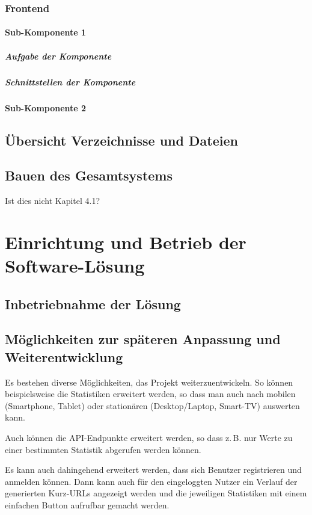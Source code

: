 \documentclass[a4paper,11pt,DIV=12,overfullrule=on]{scrreprt}%
\begin{document}
\subsection{Frontend}
\subsubsection{Sub-Komponente 1}
\paragraph{Aufgabe der Komponente}
\paragraph{Schnittstellen der Komponente}
\subsubsection{Sub-Komponente 2}
\section{Übersicht Verzeichnisse und Dateien}
\section{Bauen des Gesamtsystems}
Ist dies nicht Kapitel 4.1?


\chapter{Einrichtung und Betrieb der Software-Lösung}
\section{Inbetriebnahme der Lösung}
\section{Möglichkeiten zur späteren Anpassung und Weiterentwicklung}
Es bestehen diverse Möglichkeiten, das Projekt weiterzuentwickeln. So können beispielsweise die Statistiken erweitert werden, so dass man auch nach mobilen (Smartphone, Tablet) oder stationären (Desktop/Laptop, Smart-TV) auswerten kann. 

Auch können die \ac{API}-Endpunkte erweitert werden, so dass z.\,B. nur Werte zu einer bestimmten Statistik abgerufen werden können.

Es kann auch dahingehend erweitert werden, dass sich Benutzer registrieren und anmelden können. Dann kann auch für den eingeloggten Nutzer ein Verlauf der generierten Kurz-\ac{URL}s angezeigt werden und die jeweiligen Statistiken mit einem einfachen Button aufrufbar gemacht werden.
\end{document}
